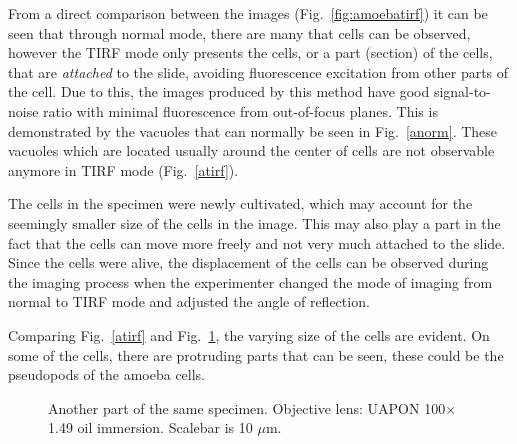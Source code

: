 From a direct comparison between the images (Fig.~\ref{fig:amoebatirf}) it can be seen that through normal mode, there are many that cells can be observed, however the TIRF mode only presents the cells, or a part (section) of the cells, that are \textit{attached} to the slide, avoiding fluorescence excitation from other parts of the cell. 
Due to this, the images produced by this method have good signal-to-noise ratio with minimal fluorescence from out-of-focus planes. 
This is demonstrated by the vacuoles that can normally be seen in Fig.~\ref{anorm}. These vacuoles which are located usually around the center of cells are not observable anymore in TIRF mode (Fig.~\ref{atirf}).

The cells in the specimen were newly cultivated, which may account for the seemingly smaller size of the cells in the image. 
This may also play a part in the fact that the cells can move more freely and not very much attached to the slide. 
Since the cells were alive, the displacement of the cells can be observed during the imaging process when the experimenter changed the mode of imaging from normal to TIRF mode and adjusted the angle of reflection.

Comparing Fig.~\ref{atirf} and Fig.~\ref{fig:amoebatirfb}, the varying size of the cells are evident. 
On some of the cells, there are protruding parts that can be seen, these could be the pseudopods of the amoeba cells.

\begin{figure}[h]
\centering
{}
\caption{Another part of the same specimen. 
Objective lens: UAPON 100$\times$ 1.49 oil immersion. 
Scalebar is 10 $\mu$m.}
\label{fig:amoebatirfb}
\end{figure}
 



%


